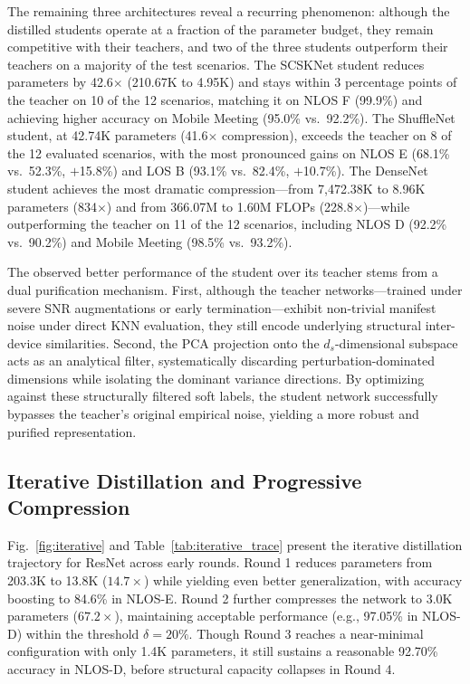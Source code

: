 \documentclass[journal,comsoc]{IEEEtran}
\begin{document}
The remaining three architectures reveal a recurring phenomenon: although the distilled students operate at a fraction of the parameter budget, they remain competitive with their teachers, and two of the three students outperform their teachers on a majority of the test scenarios.
The SCSKNet student reduces parameters by 42.6$\times$ (210.67K to 4.95K) and stays within 3 percentage points of the teacher on 10 of the 12 scenarios, matching it on NLOS F (99.9\%) and achieving higher accuracy on Mobile Meeting (95.0\% vs.\ 92.2\%).
The ShuffleNet student, at 42.74K parameters (41.6$\times$ compression), exceeds the teacher on 8 of the 12 evaluated scenarios, with the most pronounced gains on NLOS E (68.1\% vs.\ 52.3\%, $+$15.8\%) and LOS B (93.1\% vs.\ 82.4\%, $+$10.7\%).
The DenseNet student achieves the most dramatic compression---from 7,472.38K to 8.96K parameters (834$\times$) and from 366.07M to 1.60M FLOPs (228.8$\times$)---while outperforming the teacher on 11 of the 12 scenarios, including NLOS D (92.2\% vs.\ 90.2\%) and Mobile Meeting (98.5\% vs.\ 93.2\%).

The observed better performance of the student over its teacher stems from a dual purification mechanism. First, although the teacher networks—trained under severe SNR augmentations or early termination—exhibit non-trivial manifest noise under direct KNN evaluation, they still encode underlying structural inter-device similarities. Second, the PCA projection onto the $d_s$-dimensional subspace acts as an analytical filter, systematically discarding perturbation-dominated dimensions while isolating the dominant variance directions. By optimizing against these structurally filtered soft labels, the student network successfully bypasses the teacher's original empirical noise, yielding a more robust and purified representation.

\subsection{Iterative Distillation and Progressive Compression}

Fig.~\ref{fig:iterative} and Table~\ref{tab:iterative_trace} present the iterative distillation trajectory for ResNet across early rounds. Round 1 reduces parameters from 203.3K to 13.8K ($14.7\times$) while yielding even better generalization, with accuracy boosting to 84.6\% in NLOS-E. Round 2 further compresses the network to 3.0K parameters ($67.2\times$), maintaining acceptable performance (e.g., 97.05\% in NLOS-D) within the threshold $\delta = 20\%$. Though Round 3 reaches a near-minimal configuration with only 1.4K parameters, it still sustains a reasonable 92.70\% accuracy in NLOS-D, before structural capacity collapses in Round 4.
\end{document}
